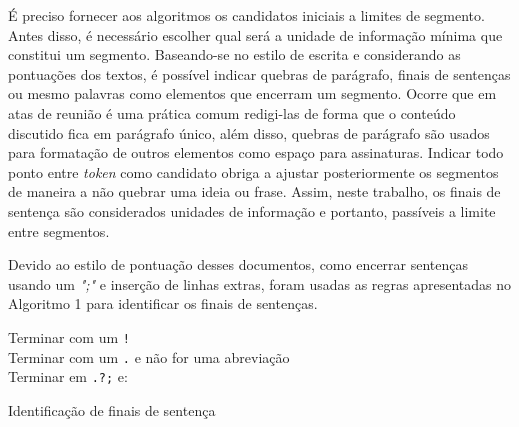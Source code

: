 	
	É preciso fornecer aos algoritmos os candidatos iniciais a limites de segmento. Antes disso, é necessário escolher qual será a unidade de informação mínima que constitui um segmento. Baseando-se no estilo de escrita e considerando as pontuações dos textos, é possível indicar quebras de parágrafo, finais de sentenças ou mesmo palavras como elementos que encerram um segmento. 
	Ocorre que em atas de reunião é uma prática comum redigi-las de forma que o conteúdo discutido fica em parágrafo único, além disso, quebras de parágrafo são usados para formatação de outros elementos como espaço para assinaturas. 
	Indicar todo ponto entre \textit{token} como candidato obriga a ajustar posteriormente os segmentos de maneira a não quebrar uma ideia ou frase. Assim, neste trabalho, os finais de sentença são considerados unidades de informação e portanto, passíveis a limite entre segmentos. 
	
	Devido ao estilo de pontuação desses documentos, como encerrar sentenças usando um \textit{";"} e inserção de linhas extras, foram usadas as regras apresentadas no Algoritmo 1 para identificar os finais de sentenças.  


\begin{algorithm}

	
	
	 {	

	Terminar com um \texttt{!}\\
	Terminar com um \texttt{.} e não for uma abreviação\\
	Terminar em \texttt{.?;} e:
	}
	
	\caption{Identificação de finais de sentença}
\end{algorithm}






